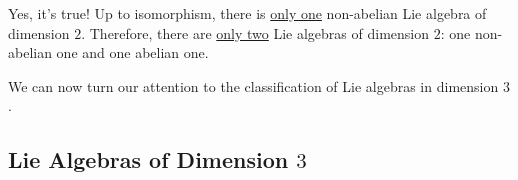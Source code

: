 Yes, it's true! Up to isomorphism, there is \underline{only one} non-abelian Lie algebra of dimension $2$. Therefore, there are \underline{only two} Lie algebras of dimension $2$: one non-abelian one and one abelian one.

We can now turn our attention to the classification of Lie algebras in dimension $3$.

\subsection{Lie Algebras of Dimension $3$}

\sorry
